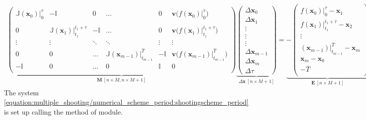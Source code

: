 \documentclass[letterpaper,10pt,english,openany,oneside]{sphinxmanual}
\begin{document}
\begin{equation}\label{equation:multiple_shooting/numerical_scheme_period:shootingscheme_period}
\begin{split}\underbrace{
\begin{pmatrix}
\mathbb{J} (\mathbf{x}_0) \Big \rvert_{0}^{\overline{\tau}}  & - \mathbb{I}& 0& \dots& 0 & \mathbf{v} \big ( f(\mathbf{x}_{0})  \big \rvert_{0}^{\overline{\tau}}\big ) \\
\\
0 & \mathbb{J} (\mathbf{x}_1)\Big \rvert_{t_{1}}^{t_{1}+\overline{\tau}}& - \mathbb{I}  & \dots & 0 & \mathbf{v} \big ( f(\mathbf{x}_{1})  \big \rvert_{t_{1}}^{ t_{1}+\overline{\tau}}\big )\\
\vdots & \vdots & \ddots & \ddots & \vdots & \vdots\\
0 & 0 &\dots & \mathbb{J}(\mathbf{x}_{m-1})\Big \rvert_{t_{m-1}}^{\overline{T}}  & - \mathbb{I} & \mathbf{v} \big ( f(\mathbf{x}_{m-1})  \big \rvert_{t_{m-1}}^{\overline{T}}\big )\\
- \mathbb{I} & 0 &\dots & 0 &  \mathbb{I} & 0\\
\end{pmatrix}}_{\mathbf{M}\ [n \times M, n \times M + 1]}
\underbrace{
\begin{pmatrix}
\Delta \mathbf{x}_{0}\\
\Delta \mathbf{x}_{1}\\
\vdots\\
\vdots\\
\vdots\\
\Delta \mathbf{x}_{m-1}\\
\Delta \mathbf{x}_{m}\\
\Delta \tau
\end{pmatrix}}_{\Delta\mathbf{x}\ [n \times M +1]}=
\underbrace{-\begin{pmatrix}
f(\mathbf{x}_0) \big \rvert_{0}^{\overline{\tau}}- \mathbf{x}_1 \\
f(\mathbf{x}_1) \big \rvert_{t_{1}}^{t_{1}+\overline{\tau}}- \mathbf{x}_2 \\
\vdots\\
(\mathbf{x}_{m-1}) \big \rvert_{t_{m-1}}^{\overline{T}} - \mathbf{x}_m\\
\mathbf{x}_{m}- \mathbf{x}_0\\
-\overline{T}\\
\end{pmatrix}}_{\mathbf{E}\ [n \times M + 1]}\end{split}
\end{equation}
The system \eqref{equation:multiple_shooting/numerical_scheme_period:shootingscheme_period} is set up calling the method  of  module.
\end{document}
